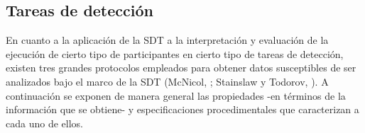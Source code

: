 
\subsection{Tareas de detección}

En cuanto a la aplicación de la SDT a la interpretación y evaluación de la ejecución de cierto tipo de participantes en cierto tipo de tareas de detección, existen tres grandes protocolos empleados para obtener datos susceptibles de ser analizados bajo el marco de la SDT (McNicol, \citeyear{McNicol2}; Stainslaw y Todorov, \citeyear{Stainslaw1999}). A continuación se exponen de manera general las propiedades -en términos de la información que se obtiene- y especificaciones procedimentales que caracterizan a cada uno de ellos.\\

